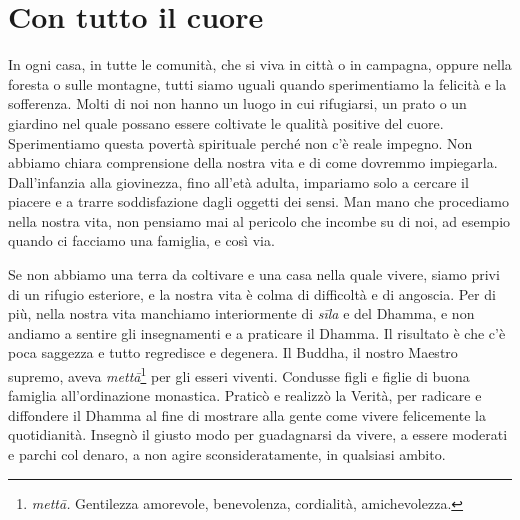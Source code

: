 \chapter{Con tutto il cuore}

In ogni casa, in tutte le comunità, che si viva in città o in campagna,
oppure nella foresta o sulle montagne, tutti siamo uguali quando
sperimentiamo la felicità e la sofferenza. Molti di noi non hanno un
luogo in cui rifugiarsi, un prato o un giardino nel quale possano essere
coltivate le qualità positive del cuore. Sperimentiamo questa povertà
spirituale perché non c'è reale impegno. Non abbiamo chiara comprensione
della nostra vita e di come dovremmo impiegarla. Dall'infanzia alla
giovinezza, fino all'età adulta, impariamo solo a cercare il piacere e a
trarre soddisfazione dagli oggetti dei sensi. Man mano che procediamo
nella nostra vita, non pensiamo mai al pericolo che incombe su di noi,
ad esempio quando ci facciamo una famiglia, e così via.

Se non abbiamo una terra da coltivare e una casa nella quale vivere,
siamo privi di un rifugio esteriore, e la nostra vita è colma di
difficoltà e di angoscia. Per di più, nella nostra vita manchiamo
interiormente di \emph{sīla} e del Dhamma, e non andiamo a sentire gli
insegnamenti e a praticare il Dhamma. Il risultato è che c'è poca
saggezza e tutto regredisce e degenera. Il Buddha, il nostro Maestro
supremo, aveva \emph{mettā}\footnote{\emph{mettā.} Gentilezza amorevole,
  benevolenza, cordialità, amichevolezza.} per gli esseri viventi.
Condusse figli e figlie di buona famiglia all'ordinazione monastica.
Praticò e realizzò la Verità, per radicare e diffondere il Dhamma al
fine di mostrare alla gente come vivere felicemente la quotidianità.
Insegnò il giusto modo per guadagnarsi da vivere, a essere moderati e
parchi col denaro, a non agire sconsideratamente, in qualsiasi ambito.

